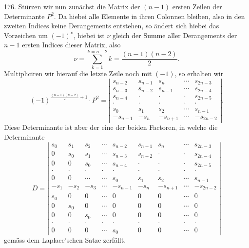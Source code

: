176. Stürzen wir nun zunächst die Matrix der $(n-1)$ ersten Zeilen der Determinante $P^2$. Da hiebei alle Elemente in ihren Colonnen bleiben, also in den zweiten Indices keine Derangements entstehen, so ändert sich hiebei das Vorzeichen um $(-1)^\nu$, hiebei ist $\nu$ gleich der Summe aller Derangements der $n-1$ ersten Indices dieser Matrix, also
\[
\nu = \sum_{k=1}^{k=n-2} k = \dfrac{(n-1)(n-2)}{2} .
\]
Multipliciren wir hierauf die letzte Zeile noch mit $(-1)$, so erhalten wir
\[
(-1)^{\frac{(n-1)(n-2)}{2}+1} \cdot P^2 =
\left|
\begin{array}{ccccc}
s_{n-2} & s_{n-1} & s_n & \cdots & s_{2n-3} \\
s_{n-3} & s_{n-2} & s_{n-1} & \cdots & s_{2n-4} \\
s_{n-4} & \cdot & \cdot & \cdot & s_{2n-5} \\
\cdot & \cdot & \cdot & \cdot & \cdot \\
s_0 & s_1 & s_2 & \cdots & s_{n-1} \\
-s_{n-1} & -s_n & -s_{n+1} & \cdots & -s_{2n-2}
\end{array}
\right| .
\]
Diese Determinante ist aber der eine der beiden Factoren, in welche die Determinante
\[
D =
\left|
\begin{array}{ccccccccc}
s_0 & s_1 & s_2 & \cdots & s_{n-2} & s_{n-1} & s_n & \cdots & s_{2n-3} \\
0 & s_0 & s_1 & \cdots & s_{n-3} & s_{n-2} & \cdot & \cdot & s_{2n-4} \\
0 & 0 & s_0 & \cdots & s_{n-4} & \cdot & \cdot & \cdot & s_{2n-5} \\
\cdot & \cdot & \cdot & \cdot & \cdot & \cdot & \cdot & \cdot & \cdot \\
0 & 0 & \cdots & \cdots & s_0 & s_1 & s_2 & \cdots & s_{n-1} \\
-s_1 & -s_2 & -s_3 & \cdots & -s_{n-1} & -s_n & -s_{n+1} & \cdots & -s_{2n-2} \\
s_0 & 0 & 0 & \cdots & 0 & 0 & 0 & \cdots & 0 \\
0 & s_0 & 0 & \cdots & 0 & 0 & 0 & \cdots & 0 \\
0 & 0 & s_0 & \cdots & 0 & 0 & 0 & \cdots & 0 \\
\cdot & \cdot & \cdot & \cdot & \cdot & \cdot & \cdot & \cdot & \cdot \\
0 & 0 & 0 & \cdots & s_0 & 0 & 0 & \cdots & 0
\end{array}
\right|
\]
gemäss dem Laplace'schen Satze zerfällt.


